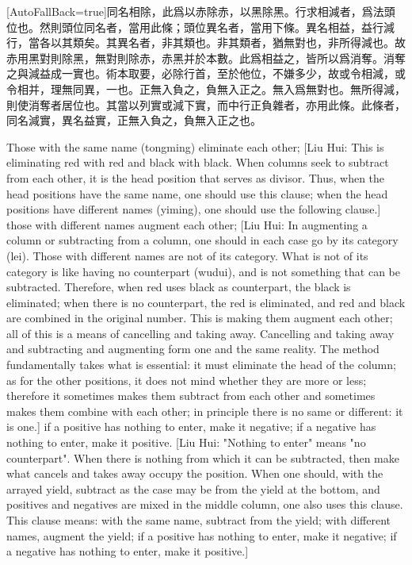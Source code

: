 \documentclass[11pt]{article}
\newcommand{\zhsmall}{\footnotesize\color{black!70}}
\newcommand{\unitlabel}[1]{\marginpar{\raggedleft\tiny\color{gray}#1}}
\newenvironment{unitzh}{\par\CJKfontspec{Noto Serif CJK SC}[AutoFallBack=true]\large\linespread{1.25}\selectfont}{\par}
\newenvironment{uniten}{\par\small\color{black!85}}{\par\medskip}
\begin{document}
\begin{unitzh}\unitlabel{jiuzhang-033.12}同名相除，{\zhsmall 此爲以赤除赤，以黑除黑。行求相減者，爲法頭位也。然則頭位同名者，當用此條；頭位異名者，當用下條。}異名相益，{\zhsmall 益行減行，當各以其類矣。其異名者，非其類也。非其類者，猶無對也，非所得減也。故赤用黑對則除黑，無對則除赤，赤黑并於本數。此爲相益之，皆所以爲消奪。消奪之與減益成一實也。術本取要，必除行首，至於他位，不嫌多少，故或令相減，或令相并，理無同異，一也。}正無入負之，負無入正之。{\zhsmall 無入爲無對也。無所得減，則使消奪者居位也。其當以列實或減下實，而中行正負雜者，亦用此條。此條者，同名減實，異名益實，正無入負之，負無入正之也。}\end{unitzh}
\begin{uniten}Those with the same name (tongming) eliminate each other; [Liu Hui: This is eliminating red with red and black with black. When columns seek to subtract from each other, it is the head position that serves as divisor. Thus, when the head positions have the same name, one should use this clause; when the head positions have different names (yiming), one should use the following clause.] those with different names augment each other; [Liu Hui: In augmenting a column or subtracting from a column, one should in each case go by its category (lei). Those with different names are not of its category. What is not of its category is like having no counterpart (wudui), and is not something that can be subtracted. Therefore, when red uses black as counterpart, the black is eliminated; when there is no counterpart, the red is eliminated, and red and black are combined in the original number. This is making them augment each other; all of this is a means of cancelling and taking away. Cancelling and taking away and subtracting and augmenting form one and the same reality. The method fundamentally takes what is essential: it must eliminate the head of the column; as for the other positions, it does not mind whether they are more or less; therefore it sometimes makes them subtract from each other and sometimes makes them combine with each other; in principle there is no same or different: it is one.] if a positive has nothing to enter, make it negative; if a negative has nothing to enter, make it positive. [Liu Hui: "Nothing to enter" means "no counterpart". When there is nothing from which it can be subtracted, then make what cancels and takes away occupy the position. When one should, with the arrayed yield, subtract as the case may be from the yield at the bottom, and positives and negatives are mixed in the middle column, one also uses this clause. This clause means: with the same name, subtract from the yield; with different names, augment the yield; if a positive has nothing to enter, make it negative; if a negative has nothing to enter, make it positive.]\end{uniten}
\end{document}
